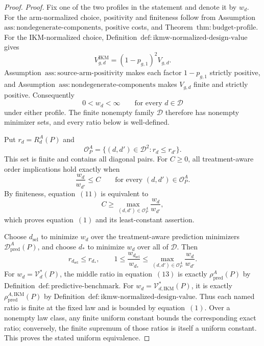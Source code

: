 \documentclass{article}
\begin{document}
\begin{proof}
\emph{Proof.}
Fix one of the two profiles in the statement and denote it by \(w_d\).  For the arm-normalized choice, positivity and finiteness follow from Assumption~\(\mathrm{ass{:}nondegenerate\text{-}components}\), positive costs, and Theorem~\(\mathrm{thm{:}budget\text{-}profile}\).  For the IKM-normalized choice, Definition~\(\mathrm{def{:}ikmw\text{-}normalized\text{-}design\text{-}value}\) gives
\[
 V_{g,d}^{\mathrm{IKM}}=(1-p_{g,1})^2V_{g,d}.
\]
Assumption~\(\mathrm{ass{:}source\text{-}arm\text{-}positivity}\) makes each factor \(1-p_{g,1}\) strictly positive, and Assumption~\(\mathrm{ass{:}nondegenerate\text{-}components}\) makes \(V_{g,d}\) finite and strictly positive.  Consequently
\[
 0<w_d<\infty
 \qquad\text{for every }d\in\mathcal D                 \tag{10}
\]
under either profile.  The finite nonempty family \(\mathcal D\) therefore has nonempty minimizer sets, and every ratio below is well-defined.

Put \(r_d=R_d^A(P)\) and
\[
 \mathcal O_P^A=\{(d,d')\in\mathcal D^2:r_d\le r_{d'}\}.
\]
This set is finite and contains all diagonal pairs.  For \(C\ge0\), all treatment-aware order implications hold exactly when
\[
 \frac{w_d}{w_{d'}}\le C
 \qquad\text{for every }(d,d')\in\mathcal O_P^A.          \tag{11}
\]
By finiteness, equation~\((11)\) is equivalent to
\[
 C\ge
 \max_{(d,d')\in\mathcal O_P^A}\frac{w_d}{w_{d'}},       \tag{12}
\]
which proves equation~\((1)\) and its least-constant assertion.

Choose \(d_{\mathrm{sel}}\) to minimize \(w_d\) over the treatment-aware prediction minimizers \(\mathcal D_{\mathrm{pred}}^A(P)\), and choose \(d_*\) to minimize \(w_d\) over all of \(\mathcal D\).  Then
\[
 r_{d_{\mathrm{sel}}}\le r_{d_*},
 \qquad
 1\le\frac{w_{d_{\mathrm{sel}}}}{w_{d_*}}
 \le \max_{(d,d')\in\mathcal O_P^A}\frac{w_d}{w_{d'}}.  \tag{13}
\]
For \(w_d=\mathcal V_d^*(P)\), the middle ratio in equation~\((13)\) is exactly \(\rho_{\mathrm{pred}}^A(P)\) by Definition~\(\mathrm{def{:}predictive\text{-}benchmark}\).  For \(w_d=\mathcal V_{d,\mathrm{IKM}}^*(P)\), it is exactly \(\rho_{\mathrm{pred}}^{A,\mathrm{IKM}}(P)\) by Definition~\(\mathrm{def{:}ikmw\text{-}normalized\text{-}design\text{-}value}\).  Thus each named ratio is finite at the fixed law and is bounded by equation~\((1)\).  Over a nonempty law class, any finite uniform constant bounds the corresponding exact ratio; conversely, the finite supremum of those ratios is itself a uniform constant.  This proves the stated uniform equivalence.


\end{proof}
\end{document}
